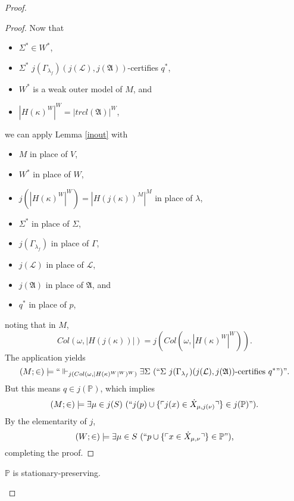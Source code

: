 \documentclass[12pt]{article}
\numberwithin{equation}{section}
\begin{document}
\begin{proof}
\begin{proof}
Now that 
\begin{itemize}
    \item $\Sigma^* \in W^*$,
    \item $\Sigma^*$ $j(\Gamma_{\lambda_f})(j(\mathcal{L}), j(\mathfrak{A}))$-certifies $q^*$,
    \item $W^*$ is a weak outer model of $M$, and
    \item $|H(\kappa)^W|^W = |trcl(\mathfrak{A})|^W$,
\end{itemize} 
we can apply Lemma \ref{inout} with 
\begin{itemize}
    \item $M$ in place of $V$,
    \item $W^*$ in place of $W$,
    \item $j(|H(\kappa)^W|^W) = |H(j(\kappa))^M|^M$ in place of $\lambda$,
    \item $\Sigma^*$ in place of $\Sigma$,
    \item $j(\Gamma_{\lambda_f})$ in place of $\Gamma$,
    \item $j(\mathcal{L})$ in place of $\mathcal{L}$,
    \item $j(\mathfrak{A})$ in place of $\mathfrak{A}$, and
    \item $q^*$ in place of $p$,
\end{itemize}
noting that in $M$, $$Col(\omega, |H(j(\kappa))|) = j(Col(\omega, |H(\kappa)^W|^W)).$$ The application yields $$(M; \in) \models ``\Vdash_{j(Col(\omega, |H(\kappa)^W|^W)^W)} \exists \Sigma \ (``\Sigma \ j(\Gamma_{\lambda_f})(j(\mathcal{L}), j(\mathfrak{A})) \text{-certifies } q^*")".$$ But this means $q \in j(\mathbb{P})$, which implies $$(M; \in) \models \exists \mu \in j(S) \ (``j(p) \cup \{\ulcorner j(x) \in \dot{X}_{\mu, j(\nu)} \urcorner\} \in j(\mathbb{P})") \text{.}$$ By the elementarity of $j$, $$(W; \in) \models \exists \mu \in S \ (``p \cup \{\ulcorner x \in \dot{X}_{\mu, \nu} \urcorner\} \in \mathbb{P}") \text{,}$$ completing the proof.
\end{proof}

\begin{lem}\label{statdone}
$\mathbb{P}$ is stationary-preserving.
\end{lem}


\end{proof}
\end{document}
